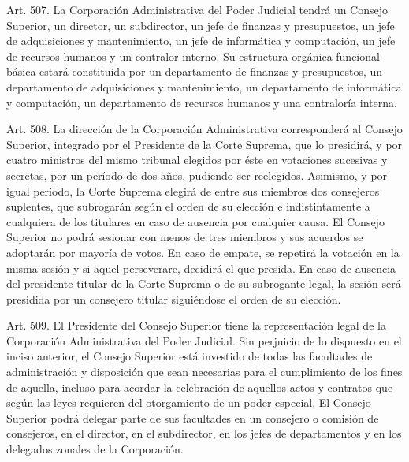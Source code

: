     Art. 507. La Corporación Administrativa del Poder Judicial tendrá un Consejo Superior, un director, un subdirector, un jefe de finanzas y presupuestos, un jefe de adquisiciones y mantenimiento, un jefe de informática y computación, un jefe de recursos humanos y un contralor interno. Su estructura orgánica funcional básica estará constituida por un departamento de finanzas y presupuestos, un departamento de adquisiciones y mantenimiento, un departamento de informática y computación, un departamento de recursos humanos y una contraloría interna.


    Art. 508. La dirección de la Corporación Administrativa corresponderá al Consejo Superior, integrado por el Presidente de la Corte Suprema, que lo presidirá, y por cuatro ministros del mismo tribunal elegidos por éste en votaciones sucesivas y secretas, por un período de dos años, pudiendo ser reelegidos.
    Asimismo, y por igual período, la Corte Suprema elegirá de entre sus miembros dos consejeros suplentes, que subrogarán según el orden de su elección e indistintamente a cualquiera de los titulares en caso de ausencia por cualquier causa.
    El Consejo Superior no podrá sesionar con menos de tres miembros y sus acuerdos se adoptarán por mayoría de votos. En caso de empate, se repetirá la votación en la misma sesión y si aquel perseverare, decidirá el que presida.
    En caso de ausencia del presidente titular de la Corte Suprema o de su subrogante legal, la sesión será presidida por un consejero titular siguiéndose el orden de su elección.


    Art. 509. El Presidente del Consejo Superior tiene la representación legal de la Corporación Administrativa del Poder Judicial.
    Sin perjuicio de lo dispuesto en el inciso anterior, el Consejo Superior está investido de todas las facultades de administración y disposición que sean necesarias para el cumplimiento de los fines de aquella, incluso para acordar la celebración de aquellos actos y contratos que según las leyes requieren del otorgamiento de un poder especial.
    El Consejo Superior podrá delegar parte de sus facultades en un consejero o comisión de consejeros, en el director, en el subdirector, en los jefes de departamentos y en los delegados zonales de la Corporación.



